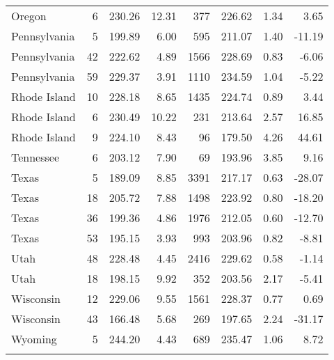 \begin{longtable}{lrrr@{\extracolsep{10pt}}rrrr}
  Oregon &   6 & 230.26 & 12.31 & 377 & 226.62 & 1.34 & 3.65 \\ 
  Pennsylvania &   5 & 199.89 & 6.00 & 595 & 211.07 & 1.40 & -11.19 \\ 
  Pennsylvania &  42 & 222.62 & 4.89 & 1566 & 228.69 & 0.83 & -6.06 \\ 
  Pennsylvania &  59 & 229.37 & 3.91 & 1110 & 234.59 & 1.04 & -5.22 \\ 
  Rhode Island &  10 & 228.18 & 8.65 & 1435 & 224.74 & 0.89 & 3.44 \\ 
  Rhode Island &   6 & 230.49 & 10.22 & 231 & 213.64 & 2.57 & 16.85 \\ 
  Rhode Island &   9 & 224.10 & 8.43 &  96 & 179.50 & 4.26 & 44.61 \\ 
  Tennessee &   6 & 203.12 & 7.90 &  69 & 193.96 & 3.85 & 9.16 \\ 
  Texas &   5 & 189.09 & 8.85 & 3391 & 217.17 & 0.63 & -28.07 \\ 
  Texas &  18 & 205.72 & 7.88 & 1498 & 223.92 & 0.80 & -18.20 \\ 
  Texas &  36 & 199.36 & 4.86 & 1976 & 212.05 & 0.60 & -12.70 \\ 
  Texas &  53 & 195.15 & 3.93 & 993 & 203.96 & 0.82 & -8.81 \\ 
  Utah &  48 & 228.48 & 4.45 & 2416 & 229.62 & 0.58 & -1.14 \\ 
  Utah &  18 & 198.15 & 9.92 & 352 & 203.56 & 2.17 & -5.41 \\ 
  Wisconsin &  12 & 229.06 & 9.55 & 1561 & 228.37 & 0.77 & 0.69 \\ 
  Wisconsin &  43 & 166.48 & 5.68 & 269 & 197.65 & 2.24 & -31.17 \\ 
  Wyoming &   5 & 244.20 & 4.43 & 689 & 235.47 & 1.06 & 8.72 \\ 
   \hline
\hline
\label{g4readinglraiclevel1}
\end{longtable}
